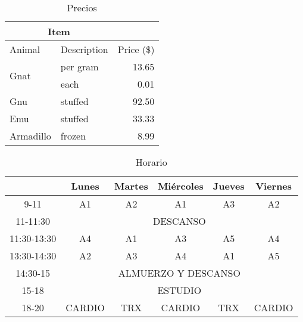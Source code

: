 \documentclass{article}
\begin{document}

\begin{table}[]
\caption{Precios}
\centering
\label{tab:precios}
\begin{tabular}{|l|l|r|}
\hline
\multicolumn{2}{|c|}{Item}          &            \\ \hline
Animal                & Description & Price (\$) \\ \hline
\multirow{2}{*}{Gnat} & per gram    & 13.65      \\ \cline{2-3} 
                      & each        & 0.01       \\ \hline
Gnu                   & stuffed     & 92.50      \\ \hline
Emu                   & stuffed     & 33.33      \\ \hline
Armadillo             & frozen      & 8.99       \\ \hline
\end{tabular}
\end{table}



\begin{table}[]
\centering
\caption{Horario}
\label{tab:horario}
\begin{tabular}{|c|c|c|c|c|c|}
\hline
            & Lunes  & Martes & Miércoles & Jueves & Viernes \\ \hline
9-11        & A1     & A2     & A1        & A3     & A2      \\ \hline
11-11:30    & \multicolumn{5}{c|}{DESCANSO}                  \\ \hline
11:30-13:30 & A4     & A1     & A3        & A5     & A4      \\ \hline
13:30-14:30 & A2     & A3     & A4        & A1     & A5      \\ \hline
14:30-15    & \multicolumn{5}{c|}{ALMUERZO Y DESCANSO}       \\ \hline
15-18       & \multicolumn{5}{c|}{ESTUDIO}                   \\ \hline
18-20       & CARDIO & TRX    & CARDIO    & TRX    & CARDIO  \\ \hline
\end{tabular}
\end{table}


\end{document}
